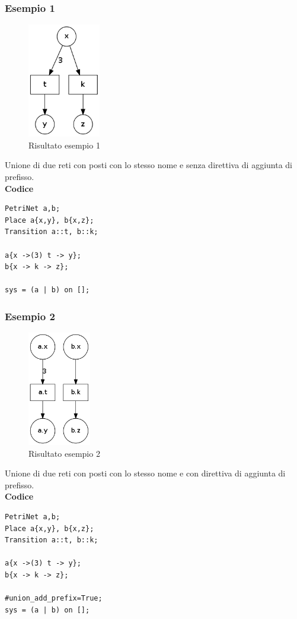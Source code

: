 \documentclass[italian,12pt]{book}
\begin{document}
\subsubsection{Esempio 1}
\begin{figure}[htb]
\centerline{\includegraphics[height=5cm]{img/unione_001.png}}
\caption{Risultato esempio 1}\label{fig:unione_001.png}
\end{figure}
Unione di due reti con posti con lo stesso nome e senza direttiva di aggiunta
di prefisso.\\
{\bf Codice}
\begin{verbatim}
PetriNet a,b;
Place a{x,y}, b{x,z};
Transition a::t, b::k;

a{x ->(3) t -> y};
b{x -> k -> z};

sys = (a | b) on [];
\end{verbatim}


\subsubsection{Esempio 2}
\begin{figure}[htb]
\centerline{\includegraphics[height=5cm]{img/unione_002.png}}
\caption{Risultato esempio 2}\label{fig:unione_002.png}
\end{figure}
Unione di due reti con posti con lo stesso nome e con direttiva di aggiunta
di prefisso.\\
{\bf Codice}
\begin{verbatim}
PetriNet a,b;
Place a{x,y}, b{x,z};
Transition a::t, b::k;

a{x ->(3) t -> y};
b{x -> k -> z};

#union_add_prefix=True;
sys = (a | b) on [];
\end{verbatim}
\end{document}
